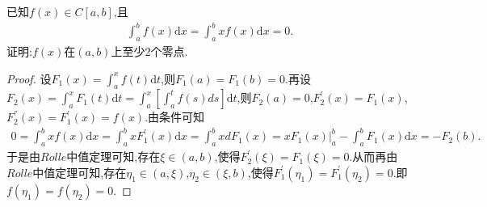 \documentclass[../../main.tex]{subfiles}
\begin{document}
\begin{example}
已知$f(x)\in C[a,b]$,且
\begin{align*}
\int_a^b{f\left( x \right) \mathrm{d}x}=\int_a^b{xf\left( x \right) \mathrm{d}x}=0.
\end{align*}
证明:$f(x)$在$(a,b)$上至少2个零点.
\end{example}
\begin{proof}
设\(F_1(x)=\int_a^x f(t)\mathrm{d}t\),则\(F_1(a)=F_1(b)=0\).再设\(F_2(x)=\int_a^x F_1(t)\mathrm{d}t=\int_a^x\left[\int_a^t f(s)ds\right]\mathrm{d}t\),则\(F_2(a)=0\),\(F_{2}^{\prime}(x)=F_1(x)\),\(F_{2}^{''}(x)=F_{1}^{\prime}(x)=f(x)\).由条件可知
\begin{align*}
0=\int_a^b xf(x)\mathrm{d}x
=\int_a^b xF_{1}^{\prime}(x)\mathrm{d}x
=\int_a^b xdF_1(x)
=xF_1(x)\Big|_{a}^{b}-\int_a^b F_1(x)\mathrm{d}x
=-F_2(b).
\end{align*}
于是由\(Rolle\)中值定理可知,存在\(\xi\in(a,b)\),使得\(F_{2}^{\prime}(\xi)=F_1(\xi)=0\).从而再由\(Rolle\)中值定理可知,存在\(\eta_1\in(a,\xi)\),\(\eta_2\in(\xi,b)\),使得\(F_{1}^{\prime}(\eta_1)=F_{1}^{\prime}(\eta_2)=0\).即\(f(\eta_1)=f(\eta_2)=0\).
\end{proof}
\end{document}
